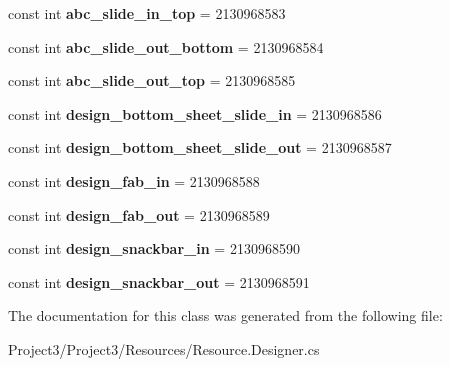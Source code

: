 \begin{DoxyCompactItemize}
\item 
\mbox{\label{classXaria_1_1Resource_1_1Animation_af9c18679a1bc958de86405a84facafc2}} 
const int {\bfseries abc\+\_\+slide\+\_\+in\+\_\+top} = 2130968583
\item 
\mbox{\label{classXaria_1_1Resource_1_1Animation_a0469f36d0a28d4a62a59399d43636495}} 
const int {\bfseries abc\+\_\+slide\+\_\+out\+\_\+bottom} = 2130968584
\item 
\mbox{\label{classXaria_1_1Resource_1_1Animation_a487e5ea2676e4676deaa7792e7c7a674}} 
const int {\bfseries abc\+\_\+slide\+\_\+out\+\_\+top} = 2130968585
\item 
\mbox{\label{classXaria_1_1Resource_1_1Animation_a10d8b8025fd98401e1ee060144a7b8d9}} 
const int {\bfseries design\+\_\+bottom\+\_\+sheet\+\_\+slide\+\_\+in} = 2130968586
\item 
\mbox{\label{classXaria_1_1Resource_1_1Animation_a3183c2c45a82c96334b682e06f4797e0}} 
const int {\bfseries design\+\_\+bottom\+\_\+sheet\+\_\+slide\+\_\+out} = 2130968587
\item 
\mbox{\label{classXaria_1_1Resource_1_1Animation_a91b2426e62035818f001941da0a1f8a9}} 
const int {\bfseries design\+\_\+fab\+\_\+in} = 2130968588
\item 
\mbox{\label{classXaria_1_1Resource_1_1Animation_aadf33360f3ce541c4a1ef9a9e04eb7cc}} 
const int {\bfseries design\+\_\+fab\+\_\+out} = 2130968589
\item 
\mbox{\label{classXaria_1_1Resource_1_1Animation_af7f92776d588434e838c6584fd73daf2}} 
const int {\bfseries design\+\_\+snackbar\+\_\+in} = 2130968590
\item 
\mbox{\label{classXaria_1_1Resource_1_1Animation_ad088391526285509a4138ada1bae6e16}} 
const int {\bfseries design\+\_\+snackbar\+\_\+out} = 2130968591
\end{DoxyCompactItemize}


The documentation for this class was generated from the following file\+:\begin{DoxyCompactItemize}
\item 
Project3/\+Project3/\+Resources/Resource.\+Designer.\+cs\end{DoxyCompactItemize}
